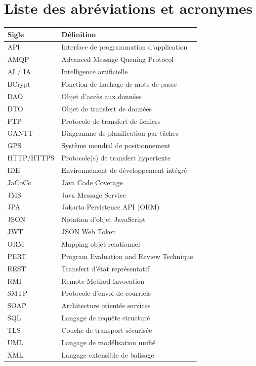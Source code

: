 \documentclass[12pt,a4paper,twoside,openright]{book}
\begin{document}
\chapter*{Liste des abréviations et acronymes}
\begin{table}[H]
  \centering
  \renewcommand{\arraystretch}{1.18}
  \begin{tabularx}{0.96\textwidth}{@{}l Y@{}}
    \toprule
    \textbf{Sigle} & \textbf{Définition} \\
    \midrule
    API & Interface de programmation d'application \\
    AMQP & Advanced Message Queuing Protocol \\
    AI / IA & Intelligence artificielle \\
    BCrypt & Fonction de hachage de mots de passe \\
    DAO & Objet d'accès aux données \\
    DTO & Objet de transfert de données \\
    FTP & Protocole de transfert de fichiers \\
    GANTT & Diagramme de planification par tâches \\
    GPS & Système mondial de positionnement \\
    HTTP/HTTPS & Protocole(s) de transfert hypertexte \\
    IDE & Environnement de développement intégré \\
    JaCoCo & Java Code Coverage \\
    JMS & Java Message Service \\
    JPA & Jakarta Persistence API (ORM) \\
    JSON & Notation d'objet JavaScript \\
    JWT & JSON Web Token \\
    ORM & Mapping objet-relationnel \\
    PERT & Program Evaluation and Review Technique \\
    REST & Transfert d'état représentatif \\
    RMI & Remote Method Invocation \\
    SMTP & Protocole d'envoi de courriels \\
    SOAP & Architecture orientée services \\
    SQL & Langage de requête structuré \\
    TLS & Couche de transport sécurisée \\
    UML & Langage de modélisation unifié \\
    XML & Langage extensible de balisage \\
    \bottomrule
  \end{tabularx}
\end{table}
\cleardoublepage
\end{document}
